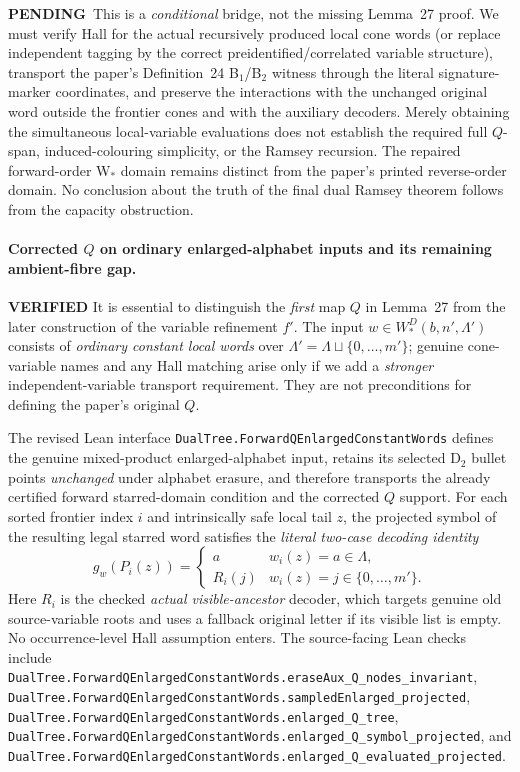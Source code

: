 \documentclass[11pt]{article}
\newcommand{\ok}{\textcolor{green!40!black}{\textbf{VERIFIED}}}
\newcommand{\todo}{\textcolor{gray!70!black}{\textbf{PENDING}}}
\newcommand{\lean}[1]{\texttt{#1}}
\begin{document}
\todo\ This is a \emph{conditional} bridge, not the missing Lemma~27
proof. We must verify Hall for the actual recursively produced local
cone words (or replace independent tagging by the correct
preidentified/correlated variable structure), transport the
paper's Definition~24 B$_1$/B$_2$ witness through the literal
signature-marker coordinates, and preserve the interactions with
the unchanged original word outside the frontier cones and with the
auxiliary decoders. Merely obtaining the simultaneous
local-variable evaluations does not establish the required full
$Q$-span, induced-colouring simplicity, or the Ramsey recursion.
The repaired forward-order W$_*$ domain remains distinct from the
paper's printed reverse-order domain. No conclusion about the truth
of the final dual Ramsey theorem follows from the capacity obstruction.


\paragraph{Corrected $Q$ on ordinary enlarged-alphabet inputs
and its remaining ambient-fibre gap.} \ok
It is essential to distinguish the \emph{first} map $Q$ in
Lemma~27 from the later construction of the variable refinement $f'$.
The input $w\in W^D_*(b,n',\Lambda')$ consists of \emph{ordinary
constant local words} over
$\Lambda'=\Lambda\sqcup\{0,\ldots,m'\}$; genuine
cone-variable names and any Hall matching arise only if we
add a \emph{stronger} independent-variable transport requirement.
They are not preconditions for defining the paper's original $Q$.

The revised Lean interface
\texttt{DualTree.ForwardQEnlargedConstantWords}
defines the genuine mixed-product enlarged-alphabet input, retains
its selected D$_2$ bullet points \emph{unchanged} under alphabet
erasure, and therefore transports the already certified forward
starred-domain condition and the corrected $Q$ support.
For each sorted frontier index $i$ and intrinsically safe local
tail $z$, the projected symbol of the resulting legal starred
word satisfies the \emph{literal two-case decoding identity}
\[
 g_w(P_i(z))=
 \begin{cases}
   a & w_i(z)=a\in\Lambda,\\
   R_i(j) & w_i(z)=j\in\{0,\ldots,m'\}.
 \end{cases}
\]
Here $R_i$ is the checked \emph{actual visible-ancestor} decoder,
which targets genuine old source-variable roots and uses a
fallback original letter if its visible list is empty. No
occurrence-level Hall assumption enters. The source-facing Lean
checks include
\lean{DualTree.ForwardQEnlargedConstantWords.eraseAux_Q_nodes_invariant},
\lean{DualTree.ForwardQEnlargedConstantWords.sampledEnlarged_projected},
\lean{DualTree.ForwardQEnlargedConstantWords.enlarged_Q_tree},
\lean{DualTree.ForwardQEnlargedConstantWords.enlarged_Q_symbol_projected},
and
\lean{DualTree.ForwardQEnlargedConstantWords.enlarged_Q_evaluated_projected}.
\end{document}

